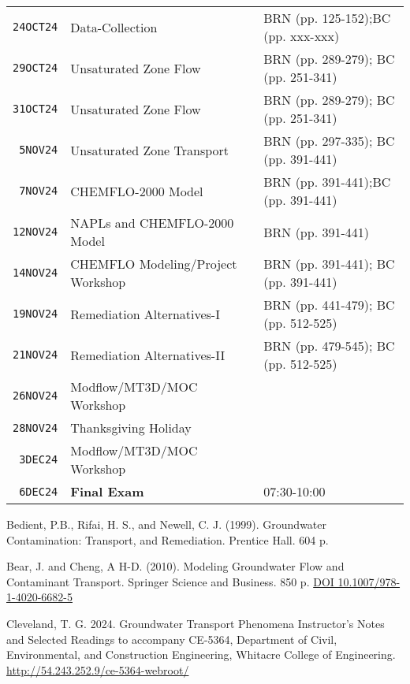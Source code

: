 \documentclass[12pt]{article}
\begin{document}
\begin{table}[ht!]
\begin{tabular}{p{0.5in}p{3.0in}p{3.0in}}
\texttt{24OCT24} & Data-Collection  & BRN (pp. 125-152);BC (pp. xxx-xxx)\\ %
\texttt{29OCT24} & Unsaturated Zone Flow & BRN (pp. 289-279); BC (pp. 251-341)\\ %
\texttt{31OCT24} & Unsaturated Zone Flow & BRN (pp. 289-279); BC (pp. 251-341)\\ %
\texttt{~5NOV24} & Unsaturated Zone Transport & BRN (pp. 297-335); BC (pp. 391-441)  \\ %
\texttt{~7NOV24} & CHEMFLO-2000 Model & BRN (pp. 391-441);BC (pp. 391-441)  \\ %
\texttt{12NOV24} & NAPLs and CHEMFLO-2000 Model & BRN (pp. 391-441)  \\ %
\texttt{14NOV24} & CHEMFLO Modeling/Project Workshop  & BRN (pp. 391-441); BC (pp. 391-441) \\ %
\texttt{19NOV24} & Remediation Alternatives-I & BRN (pp. 441-479); BC (pp. 512-525) \\ %
\texttt{21NOV24} & Remediation Alternatives-II & BRN (pp. 479-545); BC (pp. 512-525) \\ %
\texttt{26NOV24} & Modflow/MT3D/MOC Workshop &  \\ %
\texttt{28NOV24} & Thanksgiving Holiday &    \\ %
\texttt{~3DEC24} & Modflow/MT3D/MOC Workshop &  \\ %
\texttt{~6DEC24} & \textbf{Final Exam} & 07:30-10:00 \\ %
\hline
   \end{tabular}
   \label{tab:fall2024schedule}
\end{table}


\clearpage



\begin{thebibliography}{}

Bedient, P.B., Rifai, H. S., and Newell, C. J. (1999). Groundwater Contamination: Transport, and Remediation. Prentice Hall. 604 p. 

Bear, J. and Cheng, A H-D. (2010). Modeling Groundwater Flow and Contaminant Transport. Springer Science and Business. 850 p. \url{DOI 10.1007/978-1-4020-6682-5}

Cleveland, T. G. 2024. Groundwater Transport Phenomena Instructor's Notes and Selected Readings to accompany CE-5364, Department of Civil, Environmental, and Construction Engineering, Whitacre College of Engineering. \url{http://54.243.252.9/ce-5364-webroot/}

\end{thebibliography}
\end{document}
